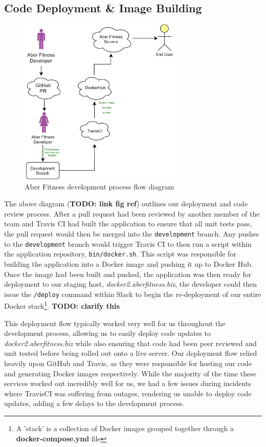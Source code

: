 
\subsection{Code Deployment \& Image Building}
\begin{figure}[H]
    \centering
    \includegraphics[width=0.7\textwidth]{Images/diagram_af.png}
    \caption{Aber Fitness development process flow diagram}
\end{figure}

The above diagram (\textbf{TODO: link fig ref}) outlines our deployment and code review process. After a pull request had been reviewed by another member of the team and Travis CI had built the application to ensure that all unit tests pass, the pull request would then be merged into the \lstinline{development} branch. Any pushes to the \lstinline{development} branch would trigger Travis CI to then run a script within the application repository, \lstinline{bin/docker.sh}. This script was responsible for building the application into a Docker image and pushing it up to Docker Hub. Once the image had been built and pushed, the application was then ready for deployment to our staging host, \textit{docker2.aberfitness.biz}, the developer could then issue the \lstinline{/deploy} command within Slack to begin the re-deployment of our entire Docker stack\footnote{A 'stack' is a collection of Docker images grouped together through a \textbf{docker-compose.yml} file}. \textbf{TODO: clarify this}

This deployment flow typically worked very well for us throughout the development process, allowing us to easily deploy code updates to \textit{docker2.aberfitness.biz} while also ensuring that code had been peer reviewed and unit tested before being rolled out onto a live server. Our deployment flow relied heavily upon GitHub and Travis, as they were responsible for hosting our code and generating Docker images respectively. While the majority of the time these services worked out incredibly well for us, we had a few issues during incidents where TravisCI was suffering from outages, rendering us unable to deploy code updates, adding a few delays to the development process.

